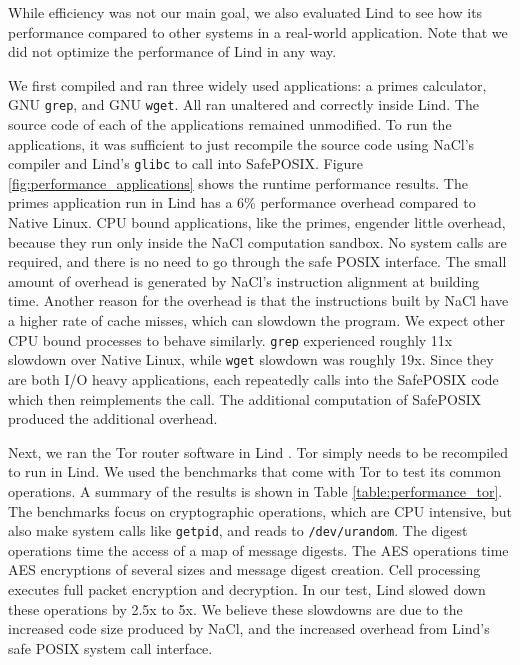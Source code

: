 While efficiency was not our main goal, we also evaluated Lind to see
how its performance compared to other systems in a real-world application.
Note that we did not optimize the performance of Lind in any way.

We first compiled and ran three widely used applications:
a primes calculator, GNU \texttt{grep}, and GNU \texttt{wget}. All ran unaltered and
correctly inside Lind. The source code of each of the applications remained
unmodified. To run the applications, it was sufficient to just recompile the
source code using NaCl's compiler and Lind's \texttt{glibc} to call
into SafePOSIX.
Figure \ref{fig:performance_applications} shows the runtime performance
results.
The primes application run in Lind has a 6\% performance overhead compared to
Native Linux. CPU bound applications, like the primes, engender little overhead,
because they run only inside the NaCl computation sandbox. No system calls are required,
and there is no need to go through the safe POSIX interface. The small amount of overhead
is generated by NaCl's instruction alignment at building time. Another reason for the overhead
is that the instructions built by NaCl have a higher rate of cache misses, which can slowdown the
program.
We expect other CPU bound processes to behave similarly.
\texttt{grep} experienced roughly 11x slowdown over Native Linux, while \texttt{wget}
slowdown was roughly 19x. Since they are both I/O heavy applications,
each repeatedly calls into the SafePOSIX code which then reimplements
the call.  The additional computation of SafePOSIX produced the additional
overhead.

Next, we ran the Tor router software in Lind . Tor simply
needs to be recompiled to run in Lind.
We used the benchmarks that come with Tor to test its common operations.
A summary of the results is shown in Table \ref{table:performance_tor}. The
benchmarks focus on cryptographic operations,
which are CPU intensive, but also make system calls like \texttt{getpid}, and reads to
\texttt{/dev/urandom}.
The digest operations time the access of a map of message digests.
The AES operations time AES encryptions of several sizes and message
digest creation.
Cell processing executes full packet encryption and decryption. In our
test, Lind slowed down these operations by 2.5x to 5x. We believe these
slowdowns are due to the increased code size produced by NaCl,
and the
increased overhead from Lind's safe POSIX system call interface.

